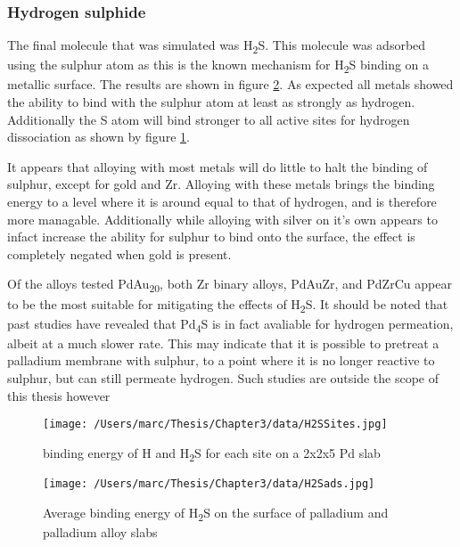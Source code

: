 \subsubsection{Hydrogen sulphide}
The final molecule that was simulated was H\textsubscript{2}S. This molecule was adsorbed using the sulphur atom as this is the known mechanism for H\textsubscript{2}S binding on a metallic surface. \cite{Morreale2007} The results are shown in figure \ref{h2sads}. As expected all metals showed the ability to bind with the sulphur atom at least as strongly as hydrogen. Additionally the S atom will bind stronger to all active sites for hydrogen dissociation as shown by figure \ref{H2Ssite}.

It appears that alloying with most metals will do little to halt the binding of sulphur, except for gold and Zr. Alloying with these metals brings the binding energy to a level where it is around equal to that of hydrogen, and is therefore more managable. Additionally while alloying with silver on it's own appears to infact increase the ability for sulphur to bind onto the surface, the effect is completely negated when gold is present. 

Of the alloys tested PdAu\textsubscript{20}, both Zr binary alloys, PdAuZr, and PdZrCu appear to be the most suitable for mitigating the effects of H\textsubscript{2}S. It should be noted that past studies have revealed that Pd\textsubscript{4}S is in fact avaliable for hydrogen permeation, albeit at a much slower rate.\cite{Morreale2007} This may indicate that it is possible to pretreat a palladium membrane with sulphur, to a point where it is no longer reactive to sulphur, but can still permeate hydrogen. Such studies are outside the scope of this thesis however

\begin{figure}
  \centering
  \texttt{[image: /Users/marc/Thesis/Chapter3/data/H2SSites.jpg]}
  \caption{binding energy of H and H\textsubscript{2}S for each site on a 2x2x5 Pd slab}
  \label{H2Ssite}
\end{figure}

\begin{landscape}

\begin{figure}
    \centering
    \texttt{[image: /Users/marc/Thesis/Chapter3/data/H2Sads.jpg]}
    \caption{Average binding energy of H\textsubscript{2}S on the surface of palladium and palladium alloy slabs}
    \label{h2sads}
  \end{figure}
\end{landscape}


